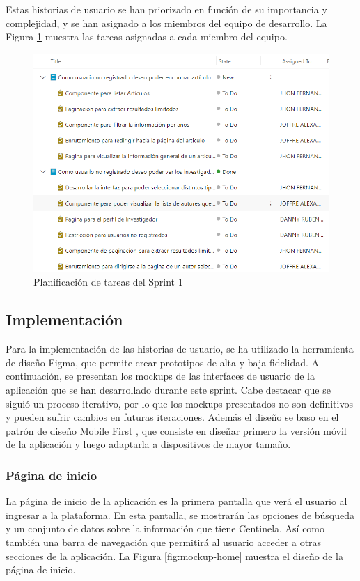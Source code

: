 Estas historias de usuario se han priorizado en función de su importancia y complejidad, y se han asignado a los miembros del equipo de desarrollo. La Figura \ref{fig:azure-board-sprint-1} muestra las tareas asignadas a cada miembro del equipo.
\begin{figure}[H]
    \centering
    \includegraphics[scale=0.9]{../02Figures/02Chapter/Sprints/Sprint-1/fig_azure-board-sprint-1.png}
    \caption{Planificación de tareas del Sprint 1}
    \label{fig:azure-board-sprint-1}
\end{figure}

\subsection{Implementación}
Para la implementación de las historias de usuario, se ha utilizado la herramienta de diseño Figma, que permite crear prototipos de alta y baja fidelidad. 
A continuación, se presentan los mockups de las interfaces de usuario de la aplicación que se han desarrollado durante este sprint.
Cabe destacar que se siguió un proceso iterativo, por lo que los mockups presentados no son definitivos y pueden sufrir cambios en futuras iteraciones.
Además el diseño se baso en el patrón de diseño Mobile First \cite{MOBILE-FIRST}, que consiste en diseñar primero la versión móvil de la aplicación y luego adaptarla a dispositivos de mayor tamaño.

\subsubsection{Página de inicio}
La página de inicio de la aplicación es la primera pantalla que verá el usuario al ingresar a la plataforma. 
En esta pantalla, se mostrarán las opciones de búsqueda y un conjunto de datos sobre la información que tiene Centinela. Así como también una barra de navegación que permitirá al usuario acceder a otras secciones de la aplicación. 
La Figura \ref{fig:mockup-home} muestra el diseño de la página de inicio.


